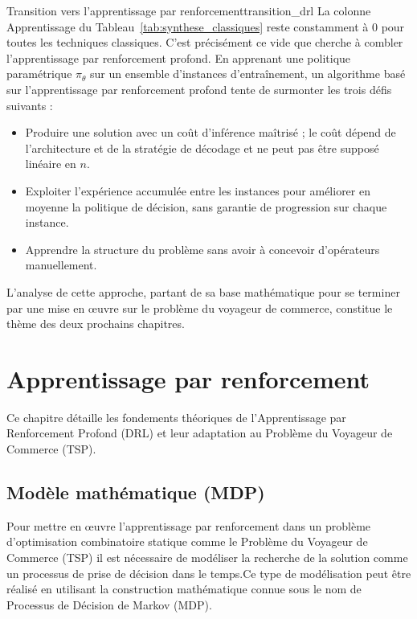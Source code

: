 \documentclass[12pt, a4paper, twoside, openright]{book}
\begin{document}
\begin{remark}{Transition vers l'apprentissage par renforcement}{transition_drl}
	La colonne \og Apprentissage \fg{} du Tableau~\ref{tab:synthese_classiques} reste constamment à 0 pour toutes les techniques classiques. C'est précisément ce vide que cherche à combler l'apprentissage par renforcement profond. En apprenant une politique paramétrique $\pi_\theta$ sur un ensemble d'instances d'entraînement, un algorithme basé sur l'apprentissage par renforcement profond tente de surmonter les trois défis suivants :
	\begin{itemize}
		\item Produire une solution avec un coût d'inférence maîtrisé ; le coût dépend de l'architecture et de la stratégie de décodage et ne peut pas être supposé linéaire en $n$.
		\item Exploiter l'expérience accumulée entre les instances pour améliorer en moyenne la politique de décision, sans garantie de progression sur chaque instance.
		\item Apprendre la structure du problème sans avoir à concevoir d'opérateurs manuellement.
	\end{itemize}
	L'analyse de cette approche, partant de sa base mathématique pour se terminer par une mise en \oe{}uvre sur le problème du voyageur de commerce, constitue le thème des deux prochains chapitres.
\end{remark}
	
	
	\chapter{Apprentissage par renforcement}
	\label{chap:apprentissage_renf}
	
	Ce chapitre détaille les fondements théoriques de l'Apprentissage par Renforcement Profond (DRL) et leur adaptation au Problème du Voyageur de Commerce (TSP).
	
	\section{Mod\`ele math\'ematique (MDP)}
	\label{sec:modele_mdp}
	
Pour mettre en \oe{}uvre l'apprentissage par renforcement dans un problème d'optimisation combinatoire statique comme le Problème du Voyageur de Commerce (TSP) il est nécessaire de modéliser la recherche de la solution comme un processus de prise de décision dans le temps.Ce type de modélisation peut être réalisé en utilisant la construction mathématique connue sous le nom de Processus de Décision de Markov (MDP).
	
\end{document}
